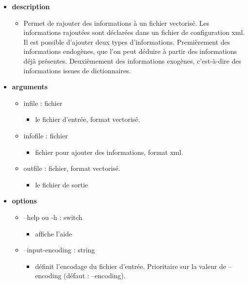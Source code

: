 \documentclass[manual-fr.tex]{subfiles}
\begin{document}
\begin{itemize}
    \item[] \textbf{description}
        \begin{itemize}
            \item[] Permet de rajouter des informations à un fichier vectorisé. Les informations rajoutées sont déclarées dans
                un fichier de configuration xml. Il est possible d'ajouter deux types d'informations. Premièrement des informations endogènes,
                que l'on peut déduire à partir des informations déjà présentes. Deuxièmement des informations exogènes, c'est-à-dire
                des informations issues de dictionnaires.
        \end{itemize}
    \item[] \textbf{arguments}
        \begin{itemize}
            \item[] infile : fichier
                \begin{itemize}
                    \item[] le fichier d'entrée, format vectorisé.
                \end{itemize}
            \item[] infofile : fichier
                \begin{itemize}
                    \item[] fichier pour ajouter des informations, format xml.
                \end{itemize}
            \item[] outfile : fichier, format vectorisé.
                \begin{itemize}
                    \item[] le fichier de sortie
                \end{itemize}
        \end{itemize}
    \item[] \textbf{options}
        \begin{itemize}
            \item[] --help ou -h : switch
                \begin{itemize}
                    \item[] affiche l'aide
                \end{itemize}
            \item[] --input-encoding : string
                \begin{itemize}
                    \item[] définit l'encodage du fichier d'entrée. Prioritaire sur la valeur de --encoding (défaut : --encoding).

\end{itemize}
\end{itemize}
\end{itemize}
\end{document}

